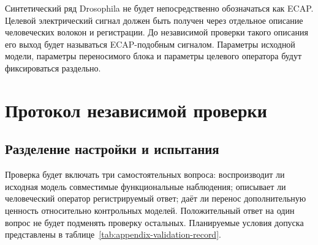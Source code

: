 Синтетический ряд Drosophila не будет непосредственно обозначаться как ECAP. Целевой электрический сигнал должен быть получен через отдельное описание человеческих волокон и регистрации. До независимой проверки такого описания его выход будет называться ECAP-подобным сигналом. Параметры исходной модели, параметры переносимого блока и параметры целевого оператора будут фиксироваться раздельно.

\chapter{Протокол независимой проверки}
\label{app:independent-validation}

\section{Разделение настройки и испытания}
Проверка будет включать три самостоятельных вопроса: воспроизводит ли исходная модель совместимые функциональные наблюдения; описывает ли человеческий оператор регистрируемый ответ; даёт ли перенос дополнительную ценность относительно контрольных моделей. Положительный ответ на один вопрос не будет подменять проверку остальных. Планируемые условия допуска представлены в таблице~\ref{tab:appendix-validation-record}.

